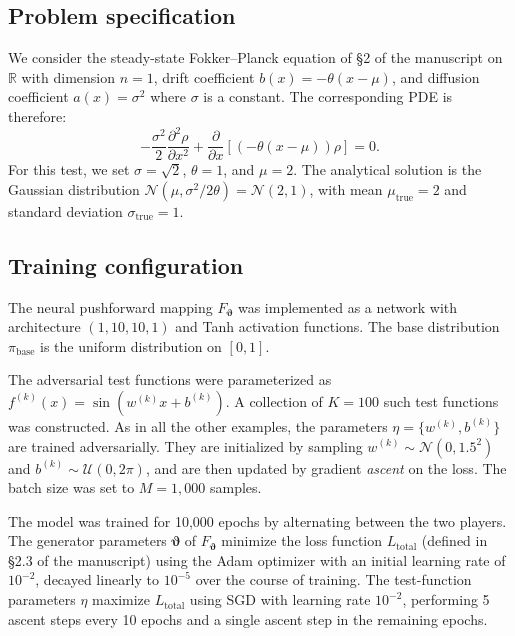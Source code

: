 \documentclass[11pt,a4paper]{article}
\newcommand{\revtwo}[1]{\textcolor{revtwocolor}{#1}}
\begin{document}
\subsection{Problem specification}
We consider the steady-state Fokker--Planck equation of \S2 of the manuscript on $\mathbb{R}$ with dimension $n=1$, drift coefficient $b(x) = -\theta (x - \mu)$, and diffusion coefficient $a(x) = \sigma^2$ where $\sigma$ is a constant.
The corresponding PDE is therefore:
\begin{equation} \label{eq:1d_fpe}
-\frac{\sigma^2}{2} \frac{\partial ^{2} \rho}{\partial x^{2}} + \frac{\partial }{\partial x}\left[ (-\theta (x-\mu)) \rho\right] = 0.
\end{equation}
For this test, we set $\sigma = \sqrt{2}$, $\theta = 1$, and $\mu = 2$. The analytical solution is the Gaussian distribution $\mathcal{N}(\mu, \sigma^2/2\theta) = \mathcal{N}(2, 1)$, with mean $\mu_{\text{true}} = 2$ and standard deviation $\sigma_{\text{true}} = 1$.

\subsection{Training configuration}
The neural pushforward mapping $F_{{\boldsymbol{\vartheta}}}$ was implemented as a network with architecture $(1, 10, 10, 1)$ and Tanh activation functions. The base distribution $\pi_{\text{base}}$ is the uniform distribution on $[0, 1]$.

The adversarial test functions were parameterized as $f^{(k)}(x) = \sin(w^{(k)} x + b^{(k)})$. A collection of $K=100$ such test functions was constructed. \revtwo{As in all the other examples, the parameters $\eta = \{w^{(k)}, b^{(k)}\}$ are trained adversarially. They are initialized by sampling $w^{(k)} \sim \mathcal{N}(0, 1.5^2)$ and $b^{(k)} \sim \mathcal{U}(0, 2\pi)$, and are then updated by gradient \emph{ascent} on the loss.} The batch size was set to $M=1{,}000$ samples.

\revtwo{The model was trained for 10,000 epochs by alternating between the two players. The generator parameters ${\boldsymbol{\vartheta}}$ of $F_{{\boldsymbol{\vartheta}}}$ minimize the loss function ${L}_{\text{total}}$ (defined in \S2.3 of the manuscript) using the Adam optimizer with an initial learning rate of $10^{-2}$, decayed linearly to $10^{-5}$ over the course of training. The test-function parameters $\eta$ maximize ${L}_{\text{total}}$ using SGD with learning rate $10^{-2}$, performing 5 ascent steps every 10 epochs and a single ascent step in the remaining epochs.}
\end{document}
